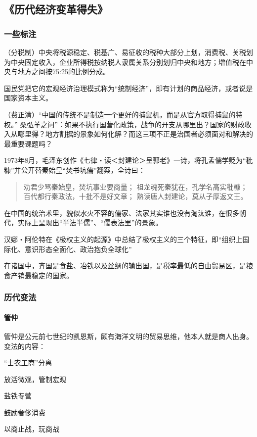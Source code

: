 \subsection{《历代经济变革得失》}

\subsubsection{一些标注}
（分税制）中央将税源稳定、税基广、易征收的税种大部分上划，消费税、关税划为中央固定收入，企业所得税按纳税人隶属关系分别划归中央和地方；增值税在中央与地方之间按75:25的比例分成。

国民党把它的宏观经济治理模式称为“统制经济”，即有计划的商品经济，或者说是国家资本主义。

（费正清）“中国的传统不是制造一个更好的捕鼠机，而是从官方取得捕鼠的特权。”
桑弘羊之问”：如果不执行国营化政策，战争的开支从哪里出？国家的财政收入从哪里得？地方割据的景象如何化解？而这三项不正是治国者必须面对和解决的最重要课题吗？

1973年8月，毛泽东创作《七律・读＜封建论＞呈郭老》一诗，将孔孟儒学贬为“秕糠”并公开替秦始皇“焚书坑儒”翻案，全诗曰：
\begin{quotation}
劝君少骂秦始皇，焚坑事业要商量； 
祖龙魂死秦犹在，孔学名高实秕糠； 
百代都行秦政法，十批不是好文章； 
熟读唐人封建论，莫从子厚返文王。
\end{quotation}

在中国的统治术里，貌似水火不容的儒家、法家其实谁也没有淘汰谁，在很多朝代，实际上呈现出“半法半儒”、“儒表法里”的景象。

汉娜・阿伦特在《极权主义的起源》中总结了极权主义的三个特征，即“组织上国际化、意识形态全面化、政治抱负全球化”

在诸国中，齐国是食盐、冶铁以及丝绸的输出国，是税率最低的自由贸易区，是粮食产销最稳定的国家。

\subsubsection{历代变法}
\paragraph{管仲}

管仲是公元前七世纪的凯恩斯，颇有海洋文明的贸易思维，他本人就是商人出身。变法的内容：
\begin{itemize*}
	\item “士农工商”分离
	\item 放活微观，管制宏观
	\item 盐铁专营
	\item 鼓励奢侈消费
	\item 以商止战，玩商战
\end{itemize*}

